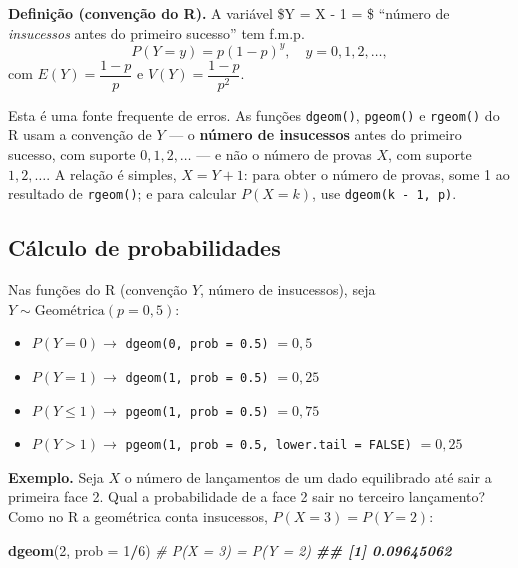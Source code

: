 \documentclass[
  portuguese,
  11pt,
  openany]{book}
\newenvironment{Shaded}{\begin{snugshade}}{\end{snugshade}}
\newcommand{\AttributeTok}[1]{\textcolor[rgb]{0.13,0.29,0.53}{#1}}
\newcommand{\CommentTok}[1]{\textcolor[rgb]{0.56,0.35,0.01}{\textit{#1}}}
\newcommand{\DecValTok}[1]{\textcolor[rgb]{0.00,0.00,0.81}{#1}}
\newcommand{\DocumentationTok}[1]{\textcolor[rgb]{0.56,0.35,0.01}{\textbf{\textit{#1}}}}
\newcommand{\FunctionTok}[1]{\textcolor[rgb]{0.13,0.29,0.53}{\textbf{#1}}}
\newcommand{\NormalTok}[1]{#1}
\newcommand{\SpecialCharTok}[1]{\textcolor[rgb]{0.81,0.36,0.00}{\textbf{#1}}}
\providecommand{\tightlist}{%
  \setlength{\itemsep}{0pt}\setlength{\parskip}{0pt}}
\begin{document}
\textbf{Definição (convenção do R).} A variável \$Y = X - 1 = \$ ``número de \emph{insucessos} antes
do primeiro sucesso'' tem f.m.p.
\[P(Y = y) = p(1-p)^{y}, \quad y = 0, 1, 2, \ldots,\]
com \(E(Y) = \dfrac{1-p}{p}\) e \(V(Y) = \dfrac{1-p}{p^2}\).

Esta é uma fonte frequente de erros. As funções \texttt{dgeom()}, \texttt{pgeom()} e \texttt{rgeom()} do R
usam a convenção de \(Y\) --- o \textbf{número de insucessos} antes do primeiro sucesso, com
suporte \(0, 1, 2, \ldots\) --- e não o número de provas \(X\), com suporte \(1, 2, \ldots\). A
relação é simples, \(X = Y + 1\): para obter o número de provas, some 1 ao resultado de
\texttt{rgeom()}; e para calcular \(P(X = k)\), use \texttt{dgeom(k\ -\ 1,\ p)}.

\subsection{Cálculo de probabilidades}\label{cuxe1lculo-de-probabilidades-2}

Nas funções do R (convenção \(Y\), número de insucessos), seja \(Y \sim \text{Geométrica}(p = 0{,}5)\):

\begin{itemize}
\tightlist
\item
  \(P(Y = 0) \to\) \texttt{dgeom(0,\ prob\ =\ 0.5)} \(= 0{,}5\)
\item
  \(P(Y = 1) \to\) \texttt{dgeom(1,\ prob\ =\ 0.5)} \(= 0{,}25\)
\item
  \(P(Y \leq 1) \to\) \texttt{pgeom(1,\ prob\ =\ 0.5)} \(= 0{,}75\)
\item
  \(P(Y > 1) \to\) \texttt{pgeom(1,\ prob\ =\ 0.5,\ lower.tail\ =\ FALSE)} \(= 0{,}25\)
\end{itemize}

\textbf{Exemplo.} Seja \(X\) o número de lançamentos de um dado equilibrado até sair a primeira
face 2. Qual a probabilidade de a face 2 sair no terceiro lançamento? Como no R a
geométrica conta insucessos, \(P(X = 3) = P(Y = 2)\):

\begin{Shaded}
\begin{Highlighting}[]
\FunctionTok{dgeom}\NormalTok{(}\DecValTok{2}\NormalTok{, }\AttributeTok{prob =} \DecValTok{1}\SpecialCharTok{/}\DecValTok{6}\NormalTok{)      }\CommentTok{\# P(X = 3) = P(Y = 2)}
\DocumentationTok{\#\# [1] 0.09645062}
\end{Highlighting}
\end{Shaded}
\end{document}
